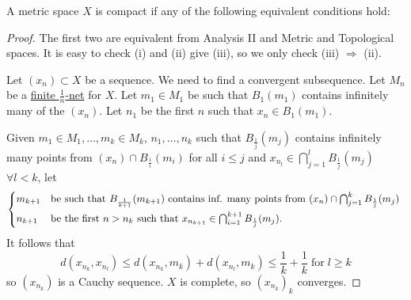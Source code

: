 \documentclass{article}
\begin{document}
\begin{prop}
    A metric space $X$ is compact if any of the following equivalent conditions hold:
\end{prop}


\begin{proof}
    The first two are equivalent from Analysis II and Metric and Topological spaces. It is easy to check (i) and (ii) give (iii), so we only check (iii) $\Rightarrow$ (ii).

    Let $(x_n) \subset X$ be a sequence. We need to find a convergent subsequence. Let $M_n$ be a \hyperlink{def:enet}{finite $\frac{1}{n}$-net} for $X$.
    Let $m_1 \in M_1$ be such that $B_1(m_1)$ contains infinitely many of the $(x_n)$. Let $n_1$ be the first $n$ such that $x_n \in B_1(m_1)$.

    Given $m_1 \in M_1, \dotsc, m_k \in M_k$, $n_1, \dotsc, n_k$ such that $B_\frac{1}{j}(m_j)$ contains infinitely many points from $(x_n) \cap B_\frac{1}{i}(m_i)$ for all $i \leq j$ and $x_{n_l} \in \bigcap_{j=1}^l B_\frac{1}{j}(m_j)$ $\forall l < k$,
    let
    \begin{align*}
        \begin{cases*}
            m_{k+1} & be such that $B_\frac{1}{k+1}(m_{k+1})$ contains inf. many points from $(x_n) \cap \bigcap_{j=1}^k B_\frac{1}{j} (m_j)$ \\
            n_{k+1} & be the first $n > n_k$ such that $x_{n_{k+1}} \in \bigcap_{i=1}^{k+1} B_{\frac{1}{j}} (m_j)$.
        \end{cases*}
    \end{align*}
    It follows that
    \begin{equation*}
        d(x_{n_k}, x_{n_l}) \leq d(x_{n_k}, m_k) + d(x_{n_l}, m_k) \leq \frac{1}{k} + \frac{1}{k} \; \text{for} \; l \geq k
    \end{equation*}
    so $(x_{n_k})$ is a Cauchy sequence. $X$ is complete, so $(x_{n_k})_k$ converges.
\end{proof}
\end{document}
